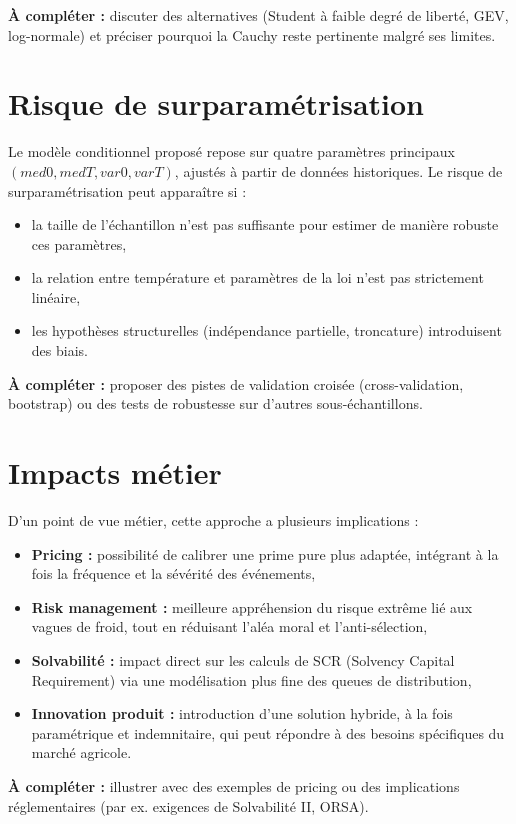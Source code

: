 \documentclass[11pt,a4paper,openright,twoside]{report}
\begin{document}
\textbf{À compléter :} discuter des alternatives (Student à faible degré de liberté, GEV, log-normale) et préciser pourquoi la Cauchy reste pertinente malgré ses limites.

\section{Risque de surparamétrisation}
Le modèle conditionnel proposé repose sur quatre paramètres principaux $(med0, medT, var0, varT)$, ajustés à partir de données historiques.  
Le risque de surparamétrisation peut apparaître si :
\begin{itemize}
    \item la taille de l’échantillon n’est pas suffisante pour estimer de manière robuste ces paramètres,
    \item la relation entre température et paramètres de la loi n’est pas strictement linéaire,
    \item les hypothèses structurelles (indépendance partielle, troncature) introduisent des biais.
\end{itemize}

\textbf{À compléter :} proposer des pistes de validation croisée (cross-validation, bootstrap) ou des tests de robustesse sur d’autres sous-échantillons.

\section{Impacts métier}
D’un point de vue métier, cette approche a plusieurs implications :
\begin{itemize}
    \item \textbf{Pricing :} possibilité de calibrer une prime pure plus adaptée, intégrant à la fois la fréquence et la sévérité des événements,
    \item \textbf{Risk management :} meilleure appréhension du risque extrême lié aux vagues de froid, tout en réduisant l’aléa moral et l’anti-sélection,
    \item \textbf{Solvabilité :} impact direct sur les calculs de SCR (Solvency Capital Requirement) via une modélisation plus fine des queues de distribution,
    \item \textbf{Innovation produit :} introduction d’une solution hybride, à la fois paramétrique et indemnitaire, qui peut répondre à des besoins spécifiques du marché agricole.
\end{itemize}

\textbf{À compléter :} illustrer avec des exemples de pricing ou des implications réglementaires (par ex. exigences de Solvabilité II, ORSA).
\end{document}
